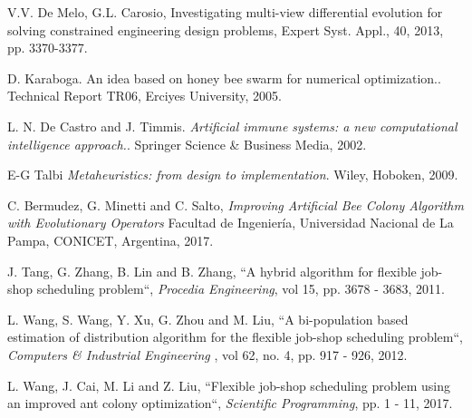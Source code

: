 \begin{thebibliography}{9}
    V.V. De Melo, G.L. Carosio, Investigating multi-view differential evolution for solving constrained engineering design problems, Expert Syst. Appl., 40, 2013, pp. 3370-3377.
    
    D. Karaboga. 
    An idea based on honey bee swarm for numerical optimization.. 
    Technical Report TR06, Erciyes University, 2005.
    
    L. N. De Castro and J. Timmis.
    \textit{Artificial immune systems: a new computational intelligence approach.}. 
    Springer Science \& Business Media, 2002.
    
    E-G Talbi
    \textit{Metaheuristics: from design to implementation}. 
    Wiley, Hoboken, 2009.
    
    C. Bermudez, G. Minetti and C. Salto, 
    \textit{Improving Artificial Bee Colony Algorithm with Evolutionary Operators} Facultad de Ingeniería, Universidad Nacional de La Pampa, CONICET, Argentina, 2017.
    
    J. Tang, G. Zhang, B. Lin and B. Zhang,
    ``A hybrid algorithm for flexible job-shop scheduling problem``, 
    \textit{Procedia Engineering}, vol 15, pp. 3678 - 3683, 2011.
    
    L. Wang, S. Wang, Y. Xu, G. Zhou and M. Liu, 
    ``A bi-population based estimation of distribution algorithm for the flexible job-shop scheduling problem``, 
    \textit{Computers \& Industrial Engineering }, vol 62, no. 4, pp. 917 - 926, 2012.

    L. Wang, J. Cai, M. Li and Z. Liu, 
    ``Flexible job-shop scheduling problem using an improved ant colony optimization``,
    \textit{Scientific Programming}, pp. 1 - 11, 2017.
\end{thebibliography}

